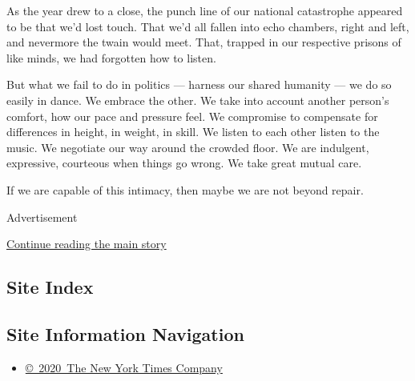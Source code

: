 As the year drew to a close, the punch line of our national catastrophe
appeared to be that we'd lost touch. That we'd all fallen into echo
chambers, right and left, and nevermore the twain would meet. That,
trapped in our respective prisons of like minds, we had forgotten how to
listen.

But what we fail to do in politics --- harness our shared humanity ---
we do so easily in dance. We embrace the other. We take into account
another person's comfort, how our pace and pressure feel. We compromise
to compensate for differences in height, in weight, in skill. We listen
to each other listen to the music. We negotiate our way around the
crowded floor. We are indulgent, expressive, courteous when things go
wrong. We take great mutual care.

If we are capable of this intimacy, then maybe we are not beyond repair.

Advertisement

\protect\hyperlink{after-bottom}{Continue reading the main story}

\hypertarget{site-index}{%
\subsection{Site Index}\label{site-index}}

\hypertarget{site-information-navigation}{%
\subsection{Site Information
Navigation}\label{site-information-navigation}}

\begin{itemize}
\tightlist
\item
  \href{https://help.nytimes3xbfgragh.onion/hc/en-us/articles/115014792127-Copyright-notice}{©~2020~The
  New York Times Company}
\end{itemize}


